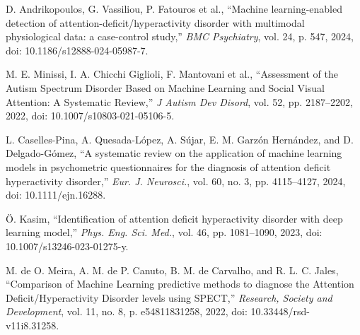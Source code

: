 \documentclass[twocolumn,12pt]{article}
\begin{document}
{\begin{thebibliography}{99}
 D. Andrikopoulos, G. Vassiliou, P. Fatouros et al., “Machine learning-enabled detection of attention-deficit/hyperactivity disorder with multimodal physiological data: a case-control study,” \textit{BMC Psychiatry}, vol. 24, p. 547, 2024, doi: 10.1186/s12888-024-05987-7.

 M. E. Minissi, I. A. Chicchi Giglioli, F. Mantovani et al., “Assessment of the Autism Spectrum Disorder Based on Machine Learning and Social Visual Attention: A Systematic Review,” \textit{J Autism Dev Disord}, vol. 52, pp. 2187–2202, 2022, doi: 10.1007/s10803-021-05106-5.

 L. Caselles-Pina, A. Quesada-López, A. Sújar, E. M. Garzón Hernández, and D. Delgado-Gómez, “A systematic review on the application of machine learning models in psychometric questionnaires for the diagnosis of attention deficit hyperactivity disorder,” \textit{Eur. J. Neurosci.}, vol. 60, no. 3, pp. 4115–4127, 2024, doi: 10.1111/ejn.16288.

 Ö. Kasim, “Identification of attention deficit hyperactivity disorder with deep learning model,” \textit{Phys. Eng. Sci. Med.}, vol. 46, pp. 1081–1090, 2023, doi: 10.1007/s13246-023-01275-y.

 M. de O. Meira, A. M. de P. Canuto, B. M. de Carvalho, and R. L. C. Jales, “Comparison of Machine Learning predictive methods to diagnose the Attention Deficit/Hyperactivity Disorder levels using SPECT,” \textit{Research, Society and Development}, vol. 11, no. 8, p. e54811831258, 2022, doi: 10.33448/rsd-v11i8.31258.

\end{thebibliography}
\endgroup
\end{document}
